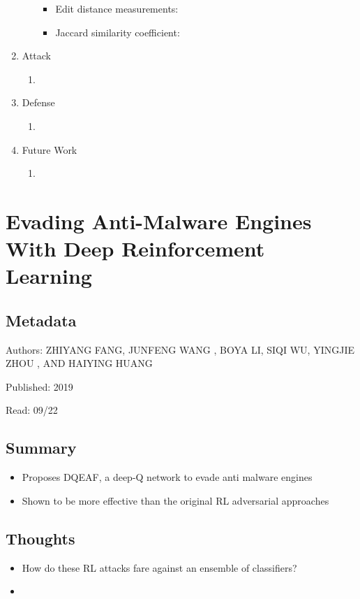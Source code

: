 \documentclass{article}
\begin{document}
\begin{enumerate}
\begin{enumerate}
\begin{itemize}
			\item Edit distance measurements: 
			\item Jaccard similarity coefficient: 
		\end{itemize}
	\end{enumerate}
	\item Attack
	\begin{enumerate}
		\item 
	\end{enumerate}
	\item Defense
	\begin{enumerate}
		\item 
	\end{enumerate}
	\item Future Work
	\begin{enumerate}
		\item 
	\end{enumerate}
\end{enumerate}
\pagebreak


\section*{Evading Anti-Malware Engines With Deep Reinforcement Learning}

\subsection*{Metadata}

\noindent Authors: ZHIYANG FANG, JUNFENG WANG , BOYA LI, SIQI WU, YINGJIE ZHOU , AND HAIYING HUANG

\noindent Published: 2019

\noindent Read: 09/22

\subsection*{Summary}
\begin{itemize}
	\item Proposes DQEAF, a deep-Q network to evade anti malware engines
	\item Shown to be more effective than the original RL adversarial approaches
\end{itemize}

\subsection*{Thoughts}
\begin{itemize}
	\item How do these RL attacks fare against an ensemble of classifiers?
	\item 
\end{itemize}
\end{document}
